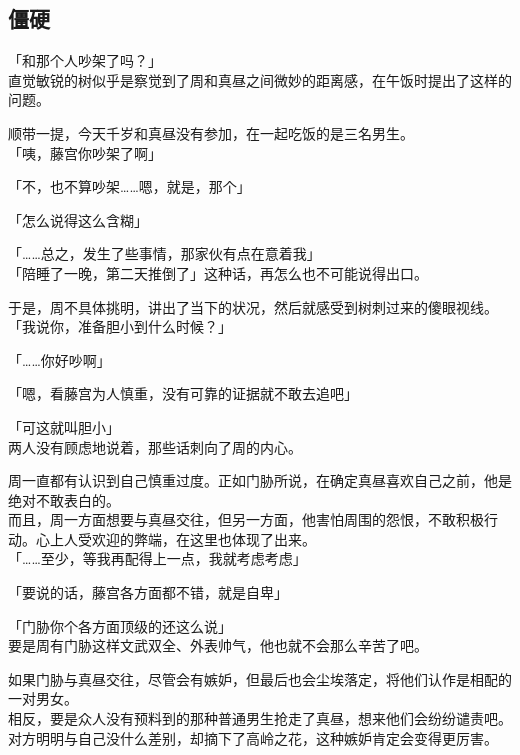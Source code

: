 \subsection{僵硬}

「和那个人吵架了吗？」\\

直觉敏锐的树似乎是察觉到了周和真昼之间微妙的距离感，在午饭时提出了这样的问题。

顺带一提，今天千岁和真昼没有参加，在一起吃饭的是三名男生。\\

「咦，藤宫你吵架了啊」

「不，也不算吵架……嗯，就是，那个」

「怎么说得这么含糊」

「……总之，发生了些事情，那家伙有点在意着我」\\

「陪睡了一晚，第二天推倒了」这种话，再怎么也不可能说得出口。

于是，周不具体挑明，讲出了当下的状况，然后就感受到树刺过来的傻眼视线。\\

「我说你，准备胆小到什么时候？」

「……你好吵啊」

「嗯，看藤宫为人慎重，没有可靠的证据就不敢去追吧」

「可这就叫胆小」\\

两人没有顾虑地说着，那些话刺向了周的内心。

周一直都有认识到自己慎重过度。正如门胁所说，在确定真昼喜欢自己之前，他是绝对不敢表白的。\\

而且，周一方面想要与真昼交往，但另一方面，他害怕周围的怨恨，不敢积极行动。心上人受欢迎的弊端，在这里也体现了出来。\\

「……至少，等我再配得上一点，我就考虑考虑」

「要说的话，藤宫各方面都不错，就是自卑」

「门胁你个各方面顶级的还这么说」\\

要是周有门胁这样文武双全、外表帅气，他也就不会那么辛苦了吧。

如果门胁与真昼交往，尽管会有嫉妒，但最后也会尘埃落定，将他们认作是相配的一对男女。\\

相反，要是众人没有预料到的那种普通男生抢走了真昼，想来他们会纷纷谴责吧。对方明明与自己没什么差别，却摘下了高岭之花，这种嫉妒肯定会变得更厉害。\\

